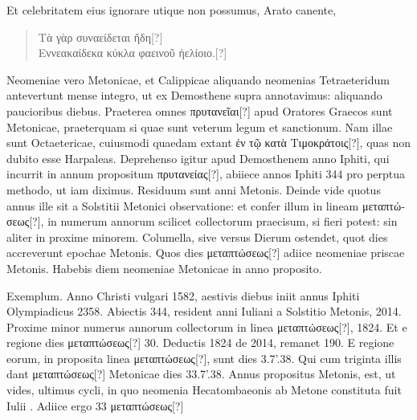 Et celebritatem eius ignorare utique non possumus, Arato canente,
\begin{verse}
\emd{} \textgreek{Τὰ γὰρ συναείδεται ἤδη[?]}\\
\textgreek{Εννεακαίδεκα κύκλα φαεινοῦ ἠελίοιο.[?]}
\end{verse}
Neomeniae vero Metonicae, et Calippicae aliquando neomenias Tetraeteridum
antevertunt mense integro, ut ex Demosthene supra annotavimus:
aliquando paucioribus diebus.
Praeterea omnes \textgreek{πρυτανεῖαι[?]}
apud Oratores Graecos sunt Metonicae, praeterquam si quae sunt veterum
legum et sanctionum.
Nam illae sunt Octaetericae, cuiusmodi
quaedam extant \textgreek{ἐν τῷ κατὰ Τιμοκράτοις[?]},
 quas non dubito esse Harpaleas.
Deprehenso igitur apud Demosthenem anno Iphiti, qui incurrit in
annum propositum \textgreek{πρυτανείας[?]}, abiiece annos Iphiti 344 pro perptua
methodo, ut iam diximus.
Residuum sunt anni Metonis.
Deinde
vide quotus annus ille sit a Solstitii Metonici
observatione: et confer illum in lineam
\textgreek{μεταπτώσεως[?]}, in numerum annorum scilicet collectorum
praecisum, si fieri potest: sin aliter in proxime
minorem.
Columella, sive versus Dierum
ostendet, quot dies accreverunt epochae Metonis.
Quos dies \textgreek{μεταπτώσεως[?]} adiice neomeniae priscae
Metonis.
Habebis diem neomeniae Metonicae
in anno proposito.
\begin{table}[htb]
 
\end{table}
%
Exemplum.
Anno Christi
vulgari 1582, aestivis diebus iniit annus Iphiti
Olympiadicus 2358.
Abiectis 344, resident anni
Iuliani a Solstitio Metonis, 2014.
Proxime minor
numerus annorum collectorum in linea \textgreek{μεταπτώσεως[?]},
1824.
Et e regione dies \textgreek{μεταπτώσεως[?]} 30.
Deductis 1824 de 2014, remanet 190.
E regione
eorum, in proposita linea \textgreek{μεταπτώσεως[?]}, sunt dies
3.7'.38.
Qui cum triginta illis dant \textgreek{μεταπτώσεως[?]}
Metonicae dies 33.7'.38.
Annus propositus Metonis,
est, ut vides, ultimus cycli, in quo neomenia
Hecatombaeonis ab Metone constituta fuit
Iulii .
%
Adiice ergo 33 \textgreek{μεταπτώσεως[?]}
